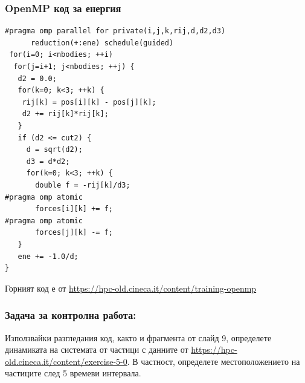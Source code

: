 \documentclass{beamer}
\begin{document}
\begin{frame}
  \frametitle{OpenMP код за енергия}
\scriptsize
\begin{verbatim}
#pragma omp parallel for private(i,j,k,rij,d,d2,d3) 
      reduction(+:ene) schedule(guided)
 for(i=0; i<nbodies; ++i)
  for(j=i+1; j<nbodies; ++j) {
   d2 = 0.0;
   for(k=0; k<3; ++k) {
    rij[k] = pos[i][k] - pos[j][k];
    d2 += rij[k]*rij[k];
   }
   if (d2 <= cut2) {
     d = sqrt(d2);
     d3 = d*d2;
     for(k=0; k<3; ++k) {
       double f = -rij[k]/d3;
#pragma omp atomic
       forces[i][k] += f;
#pragma omp atomic
       forces[j][k] -= f;
   }
   ene += -1.0/d;
}
\end{verbatim}
\end{frame}


\begin{frame}[fragile]{}
  Горният код е от
  \url{https://hpc-old.cineca.it/content/training-openmp}
\end{frame}

\begin{frame}
  \frametitle{Задача за контролна работа:}
  Използвайки разгледания код, както и фрагмента от слайд 9,
  определете динамиката на системата от частици с данните от
  \url{https://hpc-old.cineca.it/content/exercise-5-0}. В частност,
  определете местоположението на частиците след 5 времеви интервала.
\end{frame}
\end{document}
